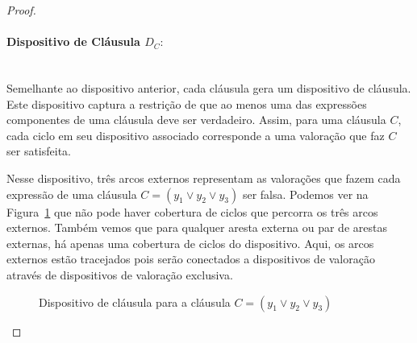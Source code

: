 \documentclass[paper=a4, fontsize=11pt]{scrartcl} %
\numberwithin{figure}{section} %
\begin{document}
\begin{proof}
\paragraph{Dispositivo de Cláusula $D_C:$} \hfill \\

Semelhante ao dispositivo anterior, cada cláusula gera um dispositivo de cláusula. Este dispositivo captura a restrição de que ao menos uma das expressões componentes de uma cláusula deve ser verdadeiro. Assim, para uma cláusula $C$, cada ciclo em seu dispositivo associado corresponde a uma valoração que faz $C$ ser satisfeita.

Nesse dispositivo, três arcos externos representam as valorações que fazem cada expressão de uma cláusula $C = (y_1 \lor y_2 \lor y_3)$ ser falsa. Podemos ver na Figura~\ref{fig:Dc} que não pode haver cobertura de ciclos que percorra os três arcos externos. Também vemos que para qualquer aresta externa ou par de arestas externas, há apenas uma cobertura de ciclos do dispositivo. Aqui, os arcos externos estão tracejados pois serão conectados a dispositivos de valoração através de dispositivos de valoração exclusiva.

\begin{figure}
\centering
{}
\caption{Dispositivo de cláusula para a cláusula $C = (y_1 \lor y_2 \lor y_3)$}
\label{fig:Dc}
\end{figure}
\FloatBarrier


\end{proof}
\end{document}
